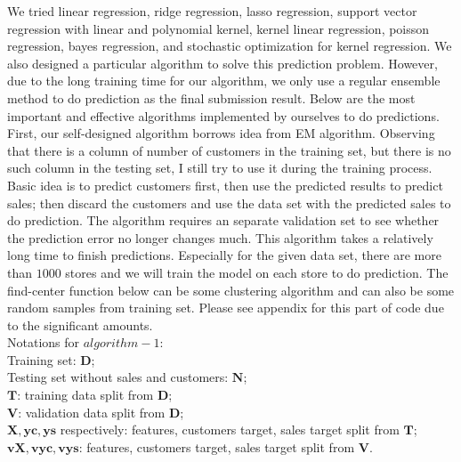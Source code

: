 \documentclass[11pt]{article}
\begin{document}
We tried linear regression, ridge regression, lasso regression, support vector regression with linear and polynomial kernel, kernel linear regression, poisson regression, bayes regression, and stochastic optimization for kernel regression. We also designed a particular algorithm to solve this prediction problem. However, due to the long training time for our algorithm, we only use a regular ensemble method to do prediction as the final submission result. Below are the most important and effective algorithms implemented by ourselves to do predictions. 
\\
First, our self-designed algorithm borrows idea from EM algorithm. Observing that there is a column of number of customers in the training set, but there is no such column in the testing set, I still try to use it during the training process. Basic idea is to predict customers first, then use the predicted results to predict sales; then discard the customers and use the data set with the predicted sales to do prediction. The algorithm requires an separate validation set to see whether the prediction error no longer changes much. This algorithm takes a relatively long time to finish predictions. Especially for the given data set, there are more than $1000$ stores and we will train the model on each store to do prediction. The find-center function below can be some clustering algorithm and can also be some random samples from training set. Please see appendix for this part of code due to the significant amounts. 
\\
Notations for $algorithm-1$: \\
Training set: $\mathbf{D}$;\\
Testing set without sales and customers: $\mathbf{N}$;\\
$\mathbf{T}$: training data split from $\mathbf{D}$; \\
$\mathbf{V}$: validation data split from $\mathbf{D}$; \\
$\mathbf{X}, \mathbf{yc}, \mathbf{ys}$ respectively: features, customers target, sales target split from $\mathbf{T}$;\\
$\mathbf{vX}, \mathbf{vyc}, \mathbf{vys}$: features, customers target, sales target split from $\mathbf{V}$.
\end{document}
